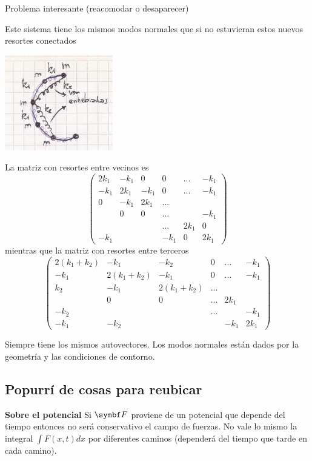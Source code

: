 \documentclass[10pt,oneside]{CBFT_book}
\begin{document}
\begin{ejemplo}{Problema interesante (reacomodar o desaparecer)}

Este sistema tiene los mismos modos normales que si no estuvieran estos nuevos resortes conectados

\includegraphics[scale=0.35]{images/fig_mc_problema_interesante.jpg}

La matriz con resortes entre vecinos es
\[
	\begin{pmatrix}
	2 k_1 & - k_1 & 0 & 0 & ... & - k_1 \\ 
	-k_1 & 2k_1 & -k_1 & 0 & ... & - k_1 \\
	0 & - k_1 & 2k_1 & ... &  \\
	& 0 & 0 & ...& & -k_1 \\
	& & &... & 2k_1 & 0 \\
	-k_1 &  &  & -k_1 & 0 & 2k_1
	\end{pmatrix}
\]
mientras que la matriz con resortes entre terceros
\[
	\begin{pmatrix}
	2 (k_1 +k_2) & - k_1 & -k_2 & 0 & ... & - k_1 \\ 
	-k_1 & 2(k_1+k_2) & -k_1 & 0 & ... & - k_1 \\
	k_2 & - k_1 & 2(k_1+k_2) & ... &  \\
	& 0 & 0 & ...& 2k_1 &  \\
	-k_2& & &... &  & -k_1 \\
	-k_1 & -k_2 &  &  & -k_1 & 2k_1
	\end{pmatrix}
\]

Siempre tiene los mismos autovectores.
Los modos normales están dados por la geometría y las condiciones de contorno.

\end{ejemplo}

\subsection{Popurrí de cosas para reubicar}

{\bf Sobre el potencial}
Si $\vb{F}$ proviene de un potencial que depende del tiempo entonces no será conservativo el campo de fuerzas.
No vale lo mismo la integral $\int F(x,t) dx$ por diferentes caminos (dependerá del tiempo que tarde en cada
camino).
\end{document}
